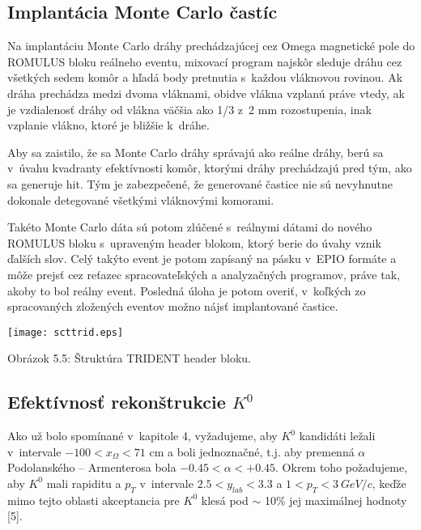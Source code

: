 \subsection{Implantácia Monte Carlo častíc}
Na implantáciu Monte Carlo dráhy prechádzajúcej cez Omega magnetické pole do
ROMULUS bloku reálneho eventu, mixovací program najskôr sleduje dráhu cez
všetkých sedem komôr a hľadá body pretnutia s~každou vláknovou rovinou. Ak
dráha prechádza medzi dvoma vláknami, obidve vlákna vzplanú práve vtedy, ak
je vzdialenosť dráhy od vlákna väčšia ako 1/3 z~2 mm rozostupenia, inak
vzplanie vlákno, ktoré je bližšie k~dráhe.

Aby sa zaistilo, že sa Monte Carlo dráhy správajú ako reálne dráhy, berú
sa  v~úvahu kvadranty efektívnosti  komôr, ktorými dráhy prechádzajú pred
tým, ako sa generuje hit. Tým je zabezpečené, že generované častice nie
sú nevyhnutne dokonale detegované všetkými vláknovými komorami.

Takéto Monte Carlo dáta sú potom zlúčené s~reálnymi dátami do nového ROMULUS
bloku s~upraveným header blokom, ktorý berie do úvahy vznik ďalších slov. 
Celý takýto event je potom zapísaný na pásku v~EPIO formáte a môže prejsť cez
reťazec spracovateľských a analyzačných programov, práve tak, akoby to bol
reálny event. Posledná úloha je potom overiť, v~koľkých zo spracovaných
zložených eventov možno nájsť implantované častice.
\begin{center}
  \texttt{[image: scttrid.eps]}
\end{center}
\begin{center}
  Obrázok 5.5: Štruktúra TRIDENT header bloku.
\end{center}


\subsection{Efektívnosť rekonštrukcie $K^{0}$}
Ako už bolo spomínané v~kapitole 4, vyžadujeme, aby $K^{0}$ kandidáti ležali
v~intervale $-100<x_{\Omega}<71$ cm a boli jednoznačné, t.j. aby premenná
$\alpha$  Podolanského -- Armenterosa bola  $-0.45<\alpha<+0.45$.
Okrem toho požadujeme, aby $K^{0}$ mali rapiditu a $p_{T}$ v~intervale
$2.5<y_{lab}<3.3$ a $1<p_{T}<3\: GeV/c$, keďže mimo tejto oblasti
akceptancia pre $K^{0}$ klesá
pod $\sim$ 10\% jej maximálnej hodnoty [5].

